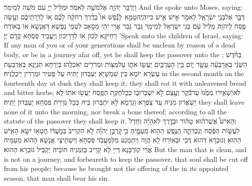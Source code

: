 {וַיְדַבֵּ֥ר יְהֹוָ֖ה אֶל\maqqaf מֹשֶׁ֥ה לֵּאמֹֽר׃}
{וּמַלֵּיל יְיָ עִם מֹשֶׁה לְמֵימַר׃}
{And the \lord\space spoke unto Moses, saying:}{}
{דַּבֵּ֛ר אֶל\maqqaf בְּנֵ֥י יִשְׂרָאֵ֖ל לֵאמֹ֑ר אִ֣ישׁ אִ֣ישׁ כִּי\maqqaf יִהְיֶֽה\maqqaf טָמֵ֣א \pasek  לָנֶ֡פֶשׁ אוֹ֩ בְדֶ֨רֶךְ רְחֹקָ֜הׄ לָכֶ֗ם א֚וֹ לְדֹרֹ֣תֵיכֶ֔ם וְעָ֥שָׂה פֶ֖סַח לַיהֹוָֽה׃}
{מַלֵּיל עִם בְּנֵי יִשְׂרָאֵל לְמֵימַר גְּבַר גְּבַר אֲרֵי יְהֵי מְסָאַב לִטְמֵי נַפְשָׁא דַּאֲנָשָׁא אוֹ בְאוֹרַח רַחִיקָא לְכוֹן אוֹ לְדָרֵיכוֹן וְיַעֲבֵיד פִּסְחָא קֳדָם יְיָ׃}
{’Speak unto the children of Israel, saying: If any man of you or of your generations shall be unclean by reason of a dead body, or be in a journey afar off, yet he shall keep the passover unto the \lord;}{}
{בַּחֹ֨דֶשׁ הַשֵּׁנִ֜י בְּאַרְבָּעָ֨ה עָשָׂ֥ר י֛וֹם בֵּ֥ין הָעַרְבַּ֖יִם יַעֲשׂ֣וּ אֹת֑וֹ עַל\maqqaf מַצּ֥וֹת וּמְרֹרִ֖ים יֹאכְלֻֽהוּ׃}
{בְּיַרְחָא תִּנְיָנָא בְּאַרְבְּעַת עֶשְׂרָא יוֹמָא בֵּין שִׁמְשַׁיָּא יַעְבְּדוּן יָתֵיהּ עַל פַּטִּיר וּמְרָרִין יֵיכְלֻנֵּיהּ׃}
{in the second month on the fourteenth day at dusk they shall keep it; they shall eat it with unleavened bread and bitter herbs;}{}
{לֹֽא\maqqaf יַשְׁאִ֤ירוּ מִמֶּ֙נּוּ֙ עַד\maqqaf בֹּ֔קֶר וְעֶ֖צֶם לֹ֣א יִשְׁבְּרוּ\maqqaf ב֑וֹ כְּכׇל\maqqaf חֻקַּ֥ת הַפֶּ֖סַח יַעֲשׂ֥וּ אֹתֽוֹ׃}
{לָא יַשְׁאֲרוּן מִנֵּיהּ עַד צַפְרָא וְגַרְמָא לָא יִתְבְּרוּן בֵּיהּ כְּכָל גְּזֵירַת פִּסְחָא יַעְבְּדוּן יָתֵיהּ׃}
{they shall leave none of it unto the morning, nor break a bone thereof; according to all the statute of the passover they shall keep it.}{}
{וְהָאִישׁ֩ אֲשֶׁר\maqqaf ה֨וּא טָה֜וֹר וּבְדֶ֣רֶךְ לֹא\maqqaf הָיָ֗ה וְחָדַל֙ לַעֲשׂ֣וֹת הַפֶּ֔סַח וְנִכְרְתָ֛ה הַנֶּ֥פֶשׁ הַהִ֖וא מֵֽעַמֶּ֑יהָ כִּ֣י \legarmeh  קׇרְבַּ֣ן יְהֹוָ֗ה לֹ֤א הִקְרִיב֙ בְּמֹ֣עֲד֔וֹ חֶטְא֥וֹ יִשָּׂ֖א הָאִ֥ישׁ הַהֽוּא׃}
{וְגוּבְרָא דְּהוּא דְּכֵי וּבְאוֹרַח לָא הֲוָה וְיִתְמְנַע מִלְּמַעֲבַד פִּסְחָא וְיִשְׁתֵּיצֵי אֲנָשָׁא הַהוּא מֵעַמֵּיהּ אֲרֵי קוּרְבָּנָא דַּייָ לָא קָרֵיב בְּזִמְנֵיהּ חוֹבֵיהּ יְקַבֵּיל גּוּבְרָא הַהוּא׃}
{But the man that is clean, and is not on a journey, and forbeareth to keep the passover, that soul shall be cut off from his people; because he brought not the offering of the \lord\space in its appointed season, that man shall bear his sin.}{}
